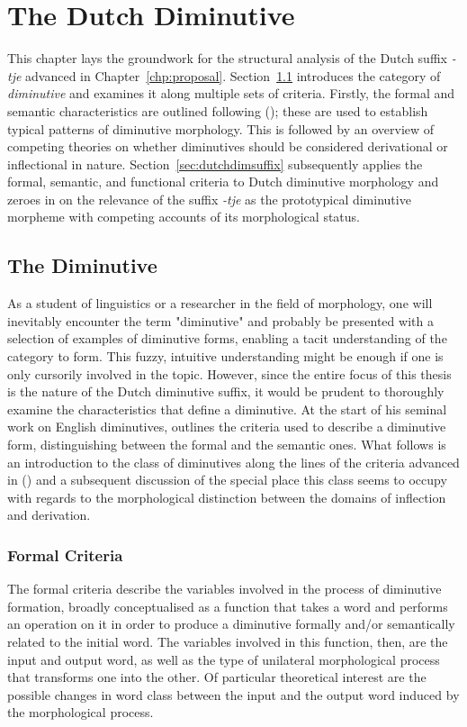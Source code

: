 \chapter{The Dutch Diminutive}
\label{chp:background}
This chapter lays the groundwork for the structural analysis of the Dutch suffix \textit{-tje} advanced in Chapter~\ref{chp:proposal}. Section~\ref{sec:2-dim} introduces the category of \textit{diminutive} and examines it along multiple sets of criteria. Firstly, the formal and semantic characteristics are outlined following \citeauthor{Schneider+2003} (\citeyear{Schneider+2003}); these are used to establish typical patterns of diminutive morphology. This is followed by an overview of competing theories on whether diminutives should be considered derivational or inflectional in nature. Section~\ref{sec:dutchdimsuffix} subsequently applies the formal, semantic, and functional criteria to Dutch diminutive morphology and zeroes in on the relevance of the suffix \textit{-tje} as the prototypical diminutive morpheme with competing accounts of its morphological status.

\section{The Diminutive}
\label{sec:2-dim}
As a student of linguistics or a researcher in the field of morphology, one will inevitably encounter the term "diminutive" and probably be presented with a selection of examples of diminutive forms, enabling a tacit understanding of the category to form. This fuzzy, intuitive understanding might be enough if one is only cursorily involved in the topic. However, since the entire focus of this thesis is the nature of the Dutch diminutive suffix, it would be prudent to thoroughly examine the characteristics that define a diminutive. At the start of his seminal \citeyear{Schneider+2003} work on English diminutives, \citeauthor{Schneider+2003} outlines the criteria used to describe a diminutive form, distinguishing between the formal and the semantic ones. What follows is an introduction to the class of diminutives along the lines of the criteria advanced in \citeauthor{Schneider+2003} (\citeyear{Schneider+2003}) and a subsequent discussion of the special place this class seems to occupy with regards to the morphological distinction between the domains of inflection and derivation.

\subsection{Formal Criteria}
\label{subsec:2-formal-crit}
The formal criteria describe the variables involved in the process of diminutive formation, broadly conceptualised as a function that takes a word and performs an operation on it in order to produce a diminutive formally and/or semantically related to the initial word. The variables involved in this function, then, are the input and output word, as well as the type of unilateral morphological process that transforms one into the other. Of particular theoretical interest are the possible changes in word class between the input and the output word induced by the morphological process. 

